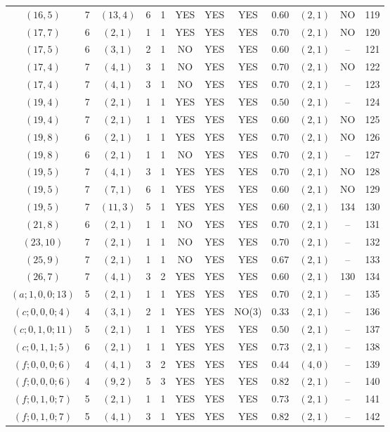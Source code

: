 \begin{longtable}{|c|c|c|c|c|c|c|c|c|c|c|c|}
$(16,5)$ & 7 & $(13,4)$ & 6 & 1 & YES & YES & YES & $0.60$ & $(2,1)$ & NO & 119\\
$(17,7)$ & 6 & $(2,1)$ & 1 & 1 & YES & YES & YES & $0.70$ & $(2,1)$ & NO & 120\\
$(17,5)$ & 6 & $(3,1)$ & 2 & 1 & NO & YES & YES & $0.60$ & $(2,1)$ & -- & 121\\
$(17,4)$ & 7 & $(4,1)$ & 3 & 1 & NO & YES & YES & $0.70$ & $(2,1)$ & NO & 122\\
$(17,4)$ & 7 & $(4,1)$ & 3 & 1 & NO & YES & YES & $0.70$ & $(2,1)$ & -- & 123\\
$(19,4)$ & 7 & $(2,1)$ & 1 & 1 & YES & YES & YES & $0.50$ & $(2,1)$ & -- & 124\\
$(19,4)$ & 7 & $(2,1)$ & 1 & 1 & YES & YES & YES & $0.60$ & $(2,1)$ & NO & 125\\
$(19,8)$ & 6 & $(2,1)$ & 1 & 1 & YES & YES & YES & $0.70$ & $(2,1)$ & NO & 126\\
$(19,8)$ & 6 & $(2,1)$ & 1 & 1 & NO & YES & YES & $0.70$ & $(2,1)$ & -- & 127\\
$(19,5)$ & 7 & $(4,1)$ & 3 & 1 & YES & YES & YES & $0.70$ & $(2,1)$ & NO & 128\\
$(19,5)$ & 7 & $(7,1)$ & 6 & 1 & YES & YES & YES & $0.60$ & $(2,1)$ & NO & 129\\
$(19,5)$ & 7 & $(11,3)$ & 5 & 1 & YES & YES & YES & $0.60$ & $(2,1)$ & 134 & 130\\
$(21,8)$ & 6 & $(2,1)$ & 1 & 1 & NO & YES & YES & $0.70$ & $(2,1)$ & -- & 131\\
$(23,10)$ & 7 & $(2,1)$ & 1 & 1 & NO & YES & YES & $0.70$ & $(2,1)$ & -- & 132\\
$(25,9)$ & 7 & $(2,1)$ & 1 & 1 & NO & YES & YES & $0.67$ & $(2,1)$ & -- & 133\\
$(26,7)$ & 7 & $(4,1)$ & 3 & 2 & YES & YES & YES & $0.60$ & $(2,1)$ & 130 & 134\\
$(a;1,0,0;13)$ & 5 & $(2,1)$ & 1 & 1 & YES & YES & YES & $0.70$ & $(2,1)$ & -- & 135\\
$(c;0,0,0;4)$ & 4 & $(3,1)$ & 2 & 1 & YES & YES & NO(3) & $0.33$ & $(2,1)$ & -- & 136\\
$(c;0,1,0;11)$ & 5 & $(2,1)$ & 1 & 1 & YES & YES & YES & $0.50$ & $(2,1)$ & -- & 137\\
$(c;0,1,1;5)$ & 6 & $(2,1)$ & 1 & 1 & YES & YES & YES & $0.73$ & $(2,1)$ & -- & 138\\
$(f;0,0,0;6)$ & 4 & $(4,1)$ & 3 & 2 & YES & YES & YES & $0.44$ & $(4,0)$ & -- & 139\\
$(f;0,0,0;6)$ & 4 & $(9,2)$ & 5 & 3 & YES & YES & YES & $0.82$ & $(2,1)$ & -- & 140\\
$(f;0,1,0;7)$ & 5 & $(2,1)$ & 1 & 1 & YES & YES & YES & $0.73$ & $(2,1)$ & -- & 141\\
$(f;0,1,0;7)$ & 5 & $(4,1)$ & 3 & 1 & YES & YES & YES & $0.82$ & $(2,1)$ & -- & 142
\end{longtable}
